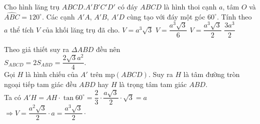 \begin{ex}%
Cho hình lăng trụ $ ABCD.A'B'C'D' $	có đáy $ ABCD $ là hình thoi cạnh $ a $, tâm $ O $ và $ \widehat{ABC} = 120^{\circ} $. Các cạnh $ A'A$, $A'B$, $A'D $ cùng tạo với đáy một góc $ 60^{\circ} $. Tính theo $ a $ thể tích $ V $ của khối lăng trụ đã cho.
	\choice
	{$ V = a^3 \sqrt{3} $}
	{$ V = \dfrac{a^3 \sqrt{3}}{6} $}
	{\True $ V = \dfrac{a^3 \sqrt{3}}{2} $}
	{$ \dfrac{3a^3}{2} $}
	\loigiai
	{
\immini
{
	Theo giả thiết suy ra $ \Delta ABD $ đều nên\\ $ S_{ABCD} = 2S_{ABD} = \dfrac{2 \sqrt{3}a^2}{4} $.\\
	Gọi $ H $ là hình chiếu của $ A' $ trên mp$ (ABCD) $. Suy ra $ H $ là tâm đường tròn ngoại tiếp tam giác đều $ ABD $ hay $ H $ là trọng tâm tam giác $ ABD. $\\
	Ta có $ A'H = AH \cdot \tan 60^{\circ} = \dfrac{2}{3} \cdot \dfrac{a \sqrt{3}}{2} \cdot \sqrt{3} = a$ \\
	$ \Rightarrow V = \dfrac{a^2 \sqrt{3}}{2} \cdot a = \dfrac{a^3 \sqrt{3}}{2} \cdot  $
}
{
}		
	}
\end{ex}
